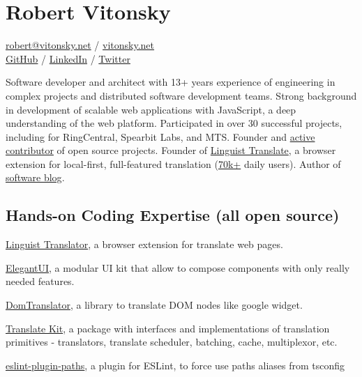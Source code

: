 \documentclass{vitonsky}
\begin{document}
\vitonskyPrintPhoto{}

\section*{\Large{Robert Vitonsky}}

\href{mailto:rob@vitonsky.net}{robert@vitonsky.net} / \href{https://vitonsky.net}{vitonsky.net}\\%
\href{https://github.com/vitonsky}{GitHub} /
\href{https://www.linkedin.com/in/vitonsky}{LinkedIn} /
\href{https://twitter.com/intent/follow?screen_name=rvitonsky}{Twitter}

\vspace*{12pt}

Software developer and architect with 13+ years experience of engineering in complex projects and distributed software development teams. Strong background in development of scalable web applications with JavaScript, a deep understanding of the web platform. Participated in over 30 successful projects, including for RingCentral, Spearbit Labs, and MTS. Founder and \href{https://github.com/vitonsky}{active contributor} of open source projects. Founder of \href{https://linguister.io}{Linguist Translate}, a browser extension for local-first, full-featured translation (\href{https://chrome.google.com/webstore/detail/gbefmodhlophhakmoecijeppjblibmie}{70k+} daily users). Author of \href{https://vitonsky.net/}{software blog}.

\subsection*{Hands-on Coding Expertise (all open source)}

\href{https://github.com/translate-tools/linguist}{Linguist Translator}, a browser
extension for translate web pages.

\href{https://github.com/vitonsky/react-elegant-ui}{ElegantUI}, a
modular UI kit that allow to compose components with only really needed features.

\href{https://github.com/translate-tools/domtranslator}{DomTranslator}, a library to translate DOM nodes like google widget.

\href{https://github.com/translate-tools/core}{Translate Kit}, a package with interfaces and implementations of translation primitives - translators, translate scheduler, batching, cache, multiplexor, etc.

\href{https://github.com/vitonsky/eslint-plugin-paths}{eslint-plugin-paths}, a plugin for ESLint, to force use paths aliases from tsconfig
\end{document}
